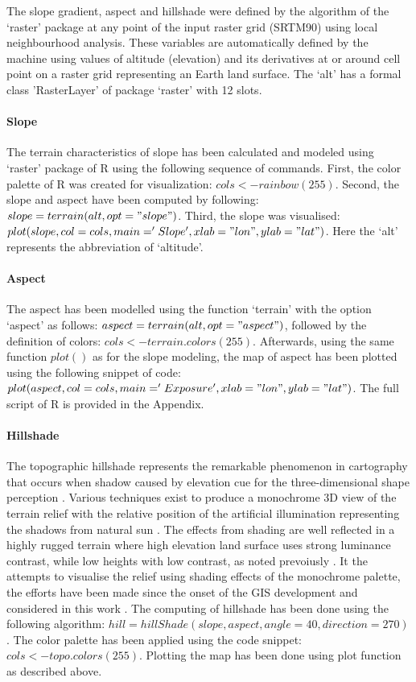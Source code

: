 \documentclass[land,article,submit,pdftex,moreauthors]{Definitions/mdpi}
\begin{document}
The slope gradient, aspect and hillshade were defined by the algorithm of the ‘raster’ package at any point of the input raster grid (SRTM90) using local neighbourhood analysis. These variables are automatically defined by the machine using values of altitude (elevation) and its derivatives at or around cell point on a raster grid representing an Earth land surface. The ‘alt’ has a formal class 'RasterLayer' of package ‘raster’ with 12 slots.

\paragraph{Slope}
The terrain characteristics of slope has been calculated and modeled using ‘raster’ package of R using the following sequence of commands. First, the color palette of R was created for visualization: $cols <- rainbow(255)$. Second, the slope and aspect have been computed by following: $slope = terrain(alt, opt = "slope")$. Third, the slope was visualised: $plot(slope, col=cols, main='Slope', xlab = "lon", ylab = "lat")$. Here the ‘alt’ represents the abbreviation of ‘altitude’.

\paragraph{Aspect}
The aspect has been modelled using the function ‘terrain’ with the option ‘aspect’ as follows: $aspect = terrain(alt, opt = "aspect")$, followed by the definition of colors: $cols <- terrain.colors(255)$. Afterwards, using the same function $plot()$ as for the slope modeling, the map of aspect has been plotted using the following snippet of code: $plot(aspect, col=cols, main='Exposure', xlab = "lon", ylab = "lat")$. The full script of R is provided in the Appendix.
 
 \paragraph{Hillshade} 
The topographic hillshade represents the remarkable phenomenon in cartography that occurs when shadow caused by elevation cue for the three-dimensional shape perception \cite{Biland,imhof2015cartographic}. Various techniques exist to produce a monochrome 3D view of the terrain relief with the relative position of the artificial illumination representing the shadows from natural sun \cite{Judd,9222263}. The effects from shading are well reflected in a highly rugged terrain where high elevation land surface uses strong luminance contrast, while low heights with low contrast, as noted prevoiusly \cite{Jenny}. It the attempts to visualise the relief using shading effects of the monochrome palette, the efforts have been made since the onset of the GIS development and considered in this work \cite{1671906,Kimerling}. The computing of hillshade has been done using the following algorithm: $hill = hillShade(slope, aspect, angle = 40, direction = 270)$. The color palette has been applied using the code snippet: $cols <- topo.colors(255)$. Plotting the map has been done using plot function as described above.
 
\end{document}

